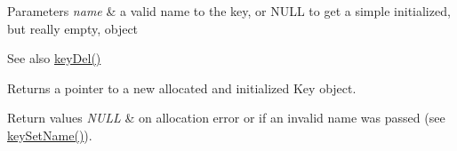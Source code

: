 \begin{DoxyParams}{Parameters}
{\em name} & a valid name to the key, or N\+U\+LL to get a simple initialized, but really empty, object \\
\hline
\end{DoxyParams}
\begin{DoxySeeAlso}{See also}
\mbox{\hyperlink{group__key_ga3df95bbc2494e3e6703ece5639be5bb1}{key\+Del()}} 
\end{DoxySeeAlso}
\begin{DoxyReturn}{Returns}
a pointer to a new allocated and initialized Key object. 
\end{DoxyReturn}

\begin{DoxyRetVals}{Return values}
{\em N\+U\+LL} & on allocation error or if an invalid {\ttfamily name} was passed (see \mbox{\hyperlink{group__keyname_ga7699091610e7f3f43d2949514a4b35d9}{key\+Set\+Name()}}). \\
\hline
\end{DoxyRetVals}
